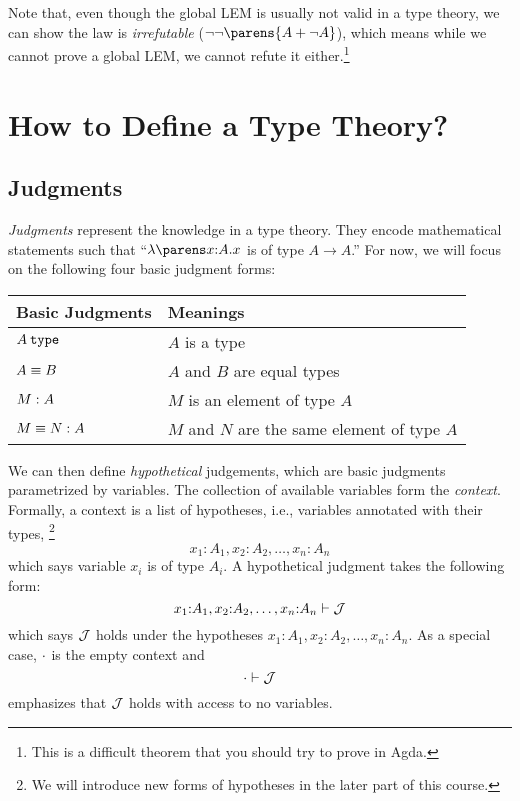 \documentclass[11pt]{article}
\begin{document}
Note that, even though the global LEM is usually not valid in a type theory, we can show the law is \emph{irrefutable} ($\neg \neg \parens{\sumtype{A}{\neg A}}$), which means while we cannot prove a global LEM, we cannot refute it either.\footnote{This is a difficult theorem that you should try to prove in Agda.}

\section{How to Define a Type Theory?}

\subsection{Judgments}

\emph{Judgments} represent the knowledge in a type theory.
They encode mathematical statements such that ``$\lam{x}[A]{x}$ is of type $A \to A$.''
For now, we will focus on the following four basic judgment forms:

\begin{center}
  \begin{tabular}{ll}
    \toprule
    Basic Judgments & Meanings \\
    \midrule
    $\istype{A}$ & $A$ is a type \\
    $\eqtype{A}{B}$ & $A$ and $B$ are equal types \\
    $\oftype{M}{A}$ & $M$ is an element of type $A$ \\
    $\eqterm{M}{N}{A}$ & $M$ and $N$ are the same element of type $A$ \\
    \bottomrule
  \end{tabular}
\end{center}

We can then define \emph{hypothetical} judgements, which are basic judgments parametrized by variables.
The collection of available variables form the \emph{context}.
Formally, a context is a list of hypotheses, i.e., variables annotated with their types,%
\footnote{We will introduce new forms of hypotheses in the later part of this course.}
\[
  x_1{:}A_1, x_2{:}A_2, \ldots, x_n{:}A_n
\]
which says variable $x_i$ is of type $A_i$.
A hypothetical judgment takes the following form:
\[
  \entails{x_1{:}A_1, x_2{:}A_2, \ldots, x_n{:}A_n}{\JJ}
\]
which says $\mathcal{J}$ holds under the hypotheses $x_1{:}A_1, x_2{:}A_2, \ldots, x_n{:}A_n$.
As a special case, $\cdot$ is the empty context and
\[
  \entails{\emptyctx}{\JJ}
\]
emphasizes that $\mathcal{J}$ holds with access to no variables.
\end{document}
